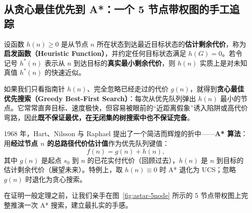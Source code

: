 \subsection{从贪心最佳优先到 A*：一个 5 节点带权图的手工追踪}

设函数 $h(n) \ge 0$ 是从节点 $n$ 所在状态到达最近目标状态的\textbf{估计剩余代价}，称为\textbf{启发函数（Heuristic Function）}，并约定任何目标状态满足 $h(G) = 0$。若令记号 $h^*(n)$ 表示从 $n$ 到达目标的\textbf{真实最小剩余代价}，则 $h(n)$ 实质上是对未知真值 $h^*(n)$ 的快速近似。

如果我们只看指南针 $h(n)$、完全忽略已经走过的代价 $g(n)$，就得到\textbf{贪心最佳优先搜索（Greedy Best-First Search）}：每次从优先队列弹出 $h(n)$ 最小的节点。它常常直奔目标、速度极快，但容易被眼前的“近距离假象”诱入陷阱或高代价弯路，因此\textbf{既不保证最优，在无闭集的树搜索中也不保证完备}。

1968 年，Hart、Nilsson 与 Raphael 提出了一个简洁而辉煌的折中——\textbf{A* 算法}：用\textbf{经过节点 $n$ 的总路径代价估计值}作为优先队列键值：
\begin{equation}\label{eq:astar-f}
  f(n) = g(n) + h(n),
\end{equation}
其中 $g(n)$ 是起点 $s_0$ 到 $n$ 的已花实付代价（回顾过去），$h(n)$ 是 $n$ 到目标的估计剩余代价（展望未来）。特例上，取 $h(n)\equiv 0$ 时 A* 退化为 UCS；忽略 $g(n)$ 时退化为贪心搜索。

在证明一般定理之前，让我们亲手在图~\ref{fig:astar-5node} 所示的 5 节点带权图上完整推演一次 A* 搜索，建立最扎实的手感。

